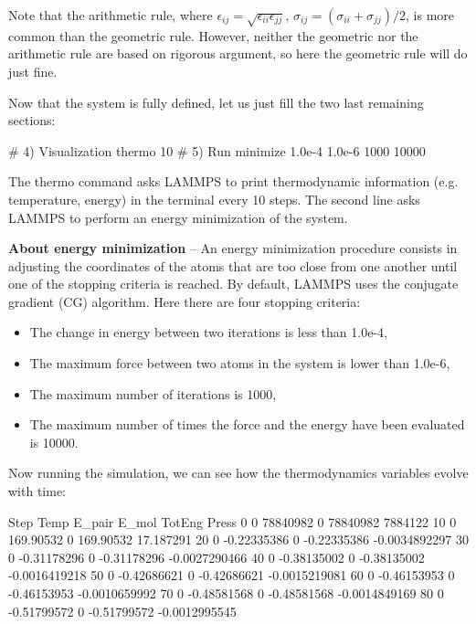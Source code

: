 \noindent Note that the arithmetic rule, where 
$\epsilon_{ij} = \sqrt{\epsilon_{ii} \epsilon_{jj}}$,
$\sigma_{ij} = (\sigma_{ii}+\sigma_{jj})/2$, 
is more common than the geometric rule. However, neither the geometric nor the
arithmetic rule are based on rigorous argument, so here
the geometric rule will do just fine. 

Now that the system is fully defined, let us just fill the two last remaining sections:

\begin{lcverbatim}
# 4) Visualization
thermo 10
# 5) Run
minimize 1.0e-4 1.0e-6 1000 10000
\end{lcverbatim}

\noindent The thermo command asks LAMMPS to print
thermodynamic information (e.g. temperature, energy) in the
terminal every 10 steps. The second line asks LAMMPS to
perform an energy minimization of the system.

\noindent \textbf{About energy minimization} -- An energy minimization procedure consists in adjusting
the coordinates of the atoms that are too close from one another until one of the stopping
criteria is reached. By default, LAMMPS uses the conjugate gradient (CG) algorithm.
Here there are four stopping criteria:
\begin{itemize}
\item The change in energy between two iterations is less than 1.0e-4,
\item The maximum force between two atoms in the system is lower than 1.0e-6,
\item The maximum number of iterations is 1000,
\item The maximum number of times the force and the energy have been evaluated is 10000.
\end{itemize}

Now running the simulation, we can see how the thermodynamics
variables evolve with time:

\begin{lcverbatim}
Step Temp         E_pair  E_mol       TotEng         Press
0       0       78840982      0     78840982       7884122 
10      0      169.90532      0    169.90532     17.187291 
20      0    -0.22335386      0  -0.22335386 -0.0034892297 
30      0    -0.31178296      0  -0.31178296 -0.0027290466 
40      0    -0.38135002      0  -0.38135002 -0.0016419218 
50      0    -0.42686621      0  -0.42686621 -0.0015219081 
60      0    -0.46153953      0  -0.46153953 -0.0010659992 
70      0    -0.48581568      0  -0.48581568 -0.0014849169 
80      0    -0.51799572      0  -0.51799572 -0.0012995545 
\end{lcverbatim}

